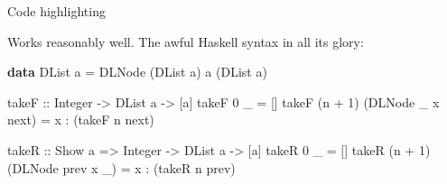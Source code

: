 \documentclass[10pt,compress]{beamer}
\makeatletter
\let\OldHref\href
\renewcommand{\href}[2]{\OldHref[pdfnewwindow]{#1}{{\textbf{#2}}}}
\newenvironment{Shaded}{\vspace{\baselineskip}\begin{shaded}}{\end{shaded}\vspace{\baselineskip}}
\newcommand{\KeywordTok}[1]{\textcolor{solarized@base00}{\textbf{#1}}}
\newcommand{\DataTypeTok}[1]{\textcolor{solarized@blue}{#1}}
\newcommand{\DecValTok}[1]{\textcolor{solarized@violet}{#1}}
\newcommand{\StringTok}[1]{\textcolor{solarized@violet}{#1}}
\newcommand{\CommentTok}[1]{\textcolor{solarized@base1}{\textit{#1}}}
\newcommand{\OtherTok}[1]{\textcolor{solarized@green}{#1}}
\newcommand{\FunctionTok}[1]{\textcolor{solarized@base1}{#1}}
\newcommand{\NormalTok}[1]{\textcolor{solarized@base00}{#1}}
\makeatother
\begin{document}
\begin{frame}[fragile]{Code highlighting}

Works reasonably well. The awful Haskell syntax in all its glory:

\begin{Shaded}
\begin{Highlighting}[]
\KeywordTok{data} \DataTypeTok{DList} \NormalTok{a }\FunctionTok{=} \DataTypeTok{DLNode} \NormalTok{(}\DataTypeTok{DList} \NormalTok{a) a (}\DataTypeTok{DList} \NormalTok{a)}

\OtherTok{takeF ::} \DataTypeTok{Integer} \OtherTok{->} \DataTypeTok{DList} \NormalTok{a }\OtherTok{->} \NormalTok{[a]}
\NormalTok{takeF }\DecValTok{0}     \NormalTok{_                   }\FunctionTok{=} \NormalTok{[]}
\NormalTok{takeF (n }\FunctionTok{+} \DecValTok{1}\NormalTok{) (}\DataTypeTok{DLNode} \NormalTok{_ x next) }\FunctionTok{=} \NormalTok{x }\FunctionTok{:} \NormalTok{(takeF n next)}

\OtherTok{takeR ::} \DataTypeTok{Show} \NormalTok{a }\OtherTok{=>} \DataTypeTok{Integer} \OtherTok{->} \DataTypeTok{DList} \NormalTok{a }\OtherTok{->} \NormalTok{[a]}
\NormalTok{takeR }\DecValTok{0}     \NormalTok{_                   }\FunctionTok{=} \NormalTok{[]}
\NormalTok{takeR (n }\FunctionTok{+} \DecValTok{1}\NormalTok{) (}\DataTypeTok{DLNode} \NormalTok{prev x _) }\FunctionTok{=} \NormalTok{x }\FunctionTok{:} \NormalTok{(takeR n prev)}
\end{Highlighting}
\end{Shaded}

\end{frame}

\end{document}
